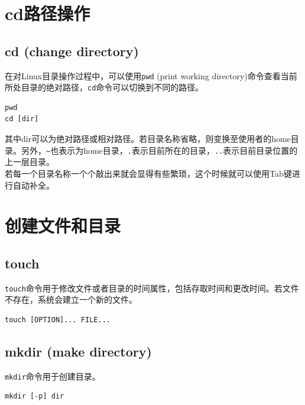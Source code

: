 \documentclass[12pt, openany, oneside]{book}
\begin{document}
\newpage

\section{cd路径操作}

\subsection{cd (change directory)}

在对Linux目录操作过程中，可以使用\lstinline|pwd| (print working directory)命令查看当前所处目录的绝对路径，\lstinline|cd|命令可以切换到不同的路径。

\vspace{-0.5cm}
\begin{lstlisting}
pwd
cd [dir]
\end{lstlisting}

其中dir可以为绝对路径或相对路径。若目录名称省略，则变换至使用者的home目录。另外，\lstinline|~|也表示为home目录，\lstinline|.|表示目前所在的目录，\lstinline|..|表示目前目录位置的上一层目录。 \\

若每一个目录名称一个个敲出来就会显得有些繁琐，这个时候就可以使用Tab键进行自动补全。

\newpage

\section{创建文件和目录}

\subsection{touch}

\lstinline|touch|命令用于修改文件或者目录的时间属性，包括存取时间和更改时间。若文件不存在，系统会建立一个新的文件。

\vspace{-0.5cm}
\begin{lstlisting}
touch [OPTION]... FILE...
\end{lstlisting}

\subsection{mkdir (make directory)}

\lstinline|mkdir|命令用于创建目录。

\vspace{-0.5cm}
\begin{lstlisting}
mkdir [-p] dir
\end{lstlisting}
\end{document}
